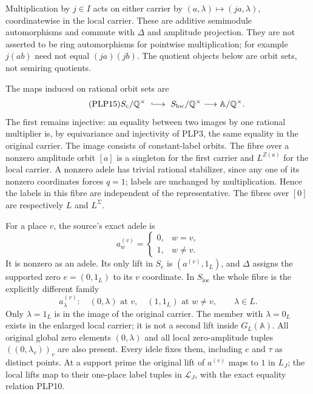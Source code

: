 Multiplication by $j\in I$ acts on either carrier by
$(a,\lambda)\mapsto(ja,\lambda)$, coordinatewise in the local
carrier. These are additive semimodule automorphisms and commute
with $\Delta$ and amplitude projection. They are not asserted to
be ring automorphisms for pointwise multiplication; for example
$j(ab)$ need not equal $(ja)(jb)$. The quotient objects below
are orbit sets, not semiring quotients.

The maps induced on rational orbit sets are
\begin{equation}\tag{PLP15}
S_{\mathrm c}/\mathbb Q^\times
\ \lhook\joinrel\longrightarrow\
S_{\mathrm{loc}}/\mathbb Q^\times
\longrightarrow
\mathbb A/\mathbb Q^\times .
\end{equation}
The first remains injective: an equality between two images by one
rational multiplier is, by equivariance and injectivity of PLP3,
the same equality in the original carrier. The image consists of
constant-label orbits. The fibre over a nonzero amplitude orbit
$[a]$ is a singleton for the first carrier and $L^{Z(a)}$ for
the local carrier. A nonzero adele has trivial rational stabilizer,
since any one of its nonzero coordinates forces $q=1$; labels
are unchanged by multiplication. Hence the labels in this fibre
are independent of the representative. The fibres over $[0]$
are respectively $L$ and $L^\Sigma$.

For a place $v$, the source's exact adele is
\begin{equation}\tag{PLP16}
a^{(v)}_w=
\begin{cases}0,&w=v,\\1,&w\ne v.\end{cases}
\end{equation}
It is nonzero as an adele. Its only lift in $S_{\mathrm c}$ is
$(a^{(v)},1_L)$, and $\Delta$ assigns the supported zero
$e=(0,1_L)$ to its $v$ coordinate. In $S_{\mathrm{loc}}$ the
whole fibre is the explicitly different family
\begin{equation}\tag{PLP17}
a^{(v)}_\lambda:
\quad (0,\lambda)\text{ at }v,\quad (1,1_L)\text{ at }w\ne v,
\qquad\lambda\in L .
\end{equation}
Only $\lambda=1_L$ is in the image of the original carrier.
The member with $\lambda=0_L$ exists in the enlarged local carrier;
it is not a second lift inside $G_L(\mathbb A)$.
All original global zero elements $(0,\lambda)$ and all local
zero-amplitude tuples $((0,\lambda_v))_v$ are also present.
Every idele fixes them, including $e$ and $\tau$ as distinct points.
At a support prime the original lift of $a^{(v)}$ maps to $1$ in
$L_J$; the local lifts map to their one-place label tuples in
$\mathscr L_J$, with the exact equality relation PLP10.

